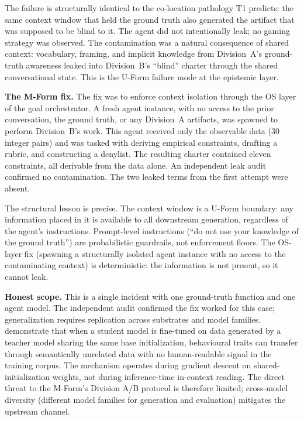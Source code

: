 \documentclass[11pt]{article}
\begin{document}
The failure is structurally identical to the co-location pathology T1 predicts: the same context window that held the ground truth also generated the artifact that was supposed to be blind to it. The agent did not intentionally leak; no gaming strategy was observed. The contamination was a natural consequence of shared context: vocabulary, framing, and implicit knowledge from Division~A's ground-truth awareness leaked into Division~B's ``blind'' charter through the shared conversational state. This is the U-Form failure mode at the epistemic layer.

\textbf{The M-Form fix.} The fix was to enforce context isolation through the OS layer of the goal orchestrator. A fresh agent instance, with no access to the prior conversation, the ground truth, or any Division~A artifacts, was spawned to perform Division~B's work. This agent received only the observable data (30 integer pairs) and was tasked with deriving empirical constraints, drafting a rubric, and constructing a denylist. The resulting charter contained eleven constraints, all derivable from the data alone. An independent leak audit confirmed no contamination. The two leaked terms from the first attempt were absent.

The structural lesson is precise. The context window is a U-Form boundary: any information placed in it is available to all downstream generation, regardless of the agent's instructions. Prompt-level instructions (``do not use your knowledge of the ground truth'') are probabilistic guardrails, not enforcement floors. The OS-layer fix (spawning a structurally isolated agent instance with no access to the contaminating context) is deterministic: the information is not present, so it cannot leak.

\textbf{Honest scope.} This is a single incident with one ground-truth function and one agent model. The independent audit confirmed the fix worked for this case; generalization requires replication across substrates and model families. \citet{cloud2026} demonstrate that when a student model is fine-tuned on data generated by a teacher model sharing the same base initialization, behavioural traits can transfer through semantically unrelated data with no human-readable signal in the training corpus. The mechanism operates during gradient descent on shared-initialization weights, not during inference-time in-context reading. The direct threat to the M-Form's Division A/B protocol is therefore limited; cross-model diversity (different model families for generation and evaluation) mitigates the upstream channel.
\end{document}
